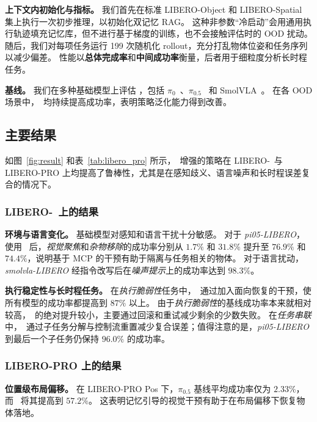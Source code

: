 \noindent\textbf{上下文内初始化与指标。}
我们首先在标准 LIBERO-Object 和 LIBERO-Spatial 集上执行一次初步推理，以初始化双记忆 RAG。
这种非参数“冷启动”会用通用执行轨迹填充记忆库，但不进行基于梯度的训练，也不会接触评估时的 OOD 扰动。
随后，我们对每项任务运行 199 次随机化 rollout，充分打乱物体位姿和任务序列以减少偏差。
性能以\textbf{总体完成率}和\textbf{中间成功率}衡量，后者用于细粒度分析长时程任务。

\noindent\textbf{基线。}
我们在多种基础模型上评估 \sys，包括 $\pi_0$~\cite{pi0}、$\pi_{0.5}$~\cite{pi05} 和 SmolVLA~\cite{SmolVLA}。
在各 OOD 场景中，\sys\ 均持续提高成功率，表明策略泛化能力得到改善。

\subsection{主要结果}
\label{Main Results}

如图~\ref{fig:result} 和表~\ref{tab:libero_pro} 所示，\sys\ 增强的策略在 LIBERO-\sys\ 与 LIBERO-PRO 上均提高了鲁棒性，尤其是在感知歧义、语言噪声和长时程误差复合的情况下。

\subsubsection{LIBERO-\sys\ 上的结果}

\noindent\textbf{环境与语言变化。}
基础模型对感知和语言干扰十分敏感。
对于 \textit{pi05-LIBERO}，使用 \sys\ 后，\textit{视觉聚焦}和\textit{杂物移除}的成功率分别从 $1.7\%$ 和 $31.8\%$ 提升至 $76.9\%$ 和 $74.4\%$，说明基于 MCP 的干预有助于隔离与任务相关的物体。
对于语言扰动，\textit{smolvla-LIBERO} 经指令改写后在\textit{噪声提示}上的成功率达到 $98.3\%$。

\noindent\textbf{执行稳定性与长时程任务。}
在\textit{执行脆弱性}任务中，\sys\ 通过加入面向恢复的干预，使所有模型的成功率都提高到 $87\%$ 以上。
由于\textit{执行脆弱性}的基线成功率本来就相对较高，\sys\ 的绝对提升较小，主要通过回滚和重试减少剩余的少数失败。
在\textit{任务串联}中，\sys\ 通过子任务分解与控制流重置减少复合误差；值得注意的是，\textit{pi05-LIBERO} 到最后一个子任务仍保持 $96.0\%$ 的成功率。

\subsubsection{LIBERO-PRO 上的结果}

\noindent\textbf{位置级布局偏移。}
在 LIBERO-PRO Pos 下，$\pi_{0.5}$ 基线平均成功率仅为 $2.33\%$，而 \sys\ 将其提高到 $57.2\%$。
这表明记忆引导的视觉干预有助于在布局偏移下恢复物体落地。

